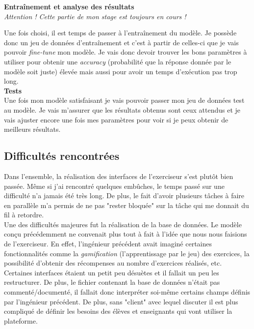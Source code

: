 \documentclass[12pt]{article}
\begin{document}
 \clearpage

\textbf{Entraînement et analyse des résultats} \\
\textit{Attention ! Cette partie de mon stage est toujours en cours !}

Une fois choisi, il est temps de passer à l'entraînement du modèle. Je possède donc un jeu de données d'entraînement et c'est à partir de celles-ci que je vais pouvoir \textit{fine-tune} mon modèle. Je vais donc devoir trouver les bons paramètres à utiliser pour obtenir une \textit{accuracy} (probabilité que la réponse donnée par le modèle soit juste) élevée mais aussi pour avoir un temps d'exécution pas trop long. \\ 

\textbf{Tests} \\
Une fois mon modèle satisfaisant je vais pouvoir passer mon jeu de données test au modèle. Je vais m'assurer que les résultats obtenus sont ceux attendus et je vais ajuster encore une fois mes paramètres pour voir si je peux obtenir de meilleurs résultats.  


\subsection{Difficultés rencontrées}

Dans l’ensemble, la réalisation des interfaces de l’exerciseur s’est plutôt bien passée. Même si j’ai rencontré quelques embûches, le temps passé sur une difficulté n’a jamais été très long. De plus, le fait d’avoir plusieurs tâches à faire en parallèle m’a permis de ne pas "rester bloquée" sur la tâche qui me donnait du fil à retordre. \\

Une des difficultés majeures fut la réalisation de la base de données. Le modèle conçu précédemment ne convenait plus tout à fait à l'idée que nous nous faisions de l’exerciseur. En effet, l'ingénieur précédent avait imaginé certaines fonctionnalités comme la \textit{gamification} (l'apprentissage par le jeu) des exercices, la possibilité d'obtenir des récompenses au nombre d'exercices réalisés, etc. Certaines interfaces étaient un petit peu désuètes et il fallait un peu les restructurer.   
De plus, le fichier contenant la base de données n’était pas commenté/documenté, il fallait donc interpréter soi-même certains champs définis par l’ingénieur précédent.  De plus, sans "client" avec lequel discuter il est plus compliqué de définir les besoins des élèves et enseignants qui vont utiliser la plateforme. \\
\end{document}
